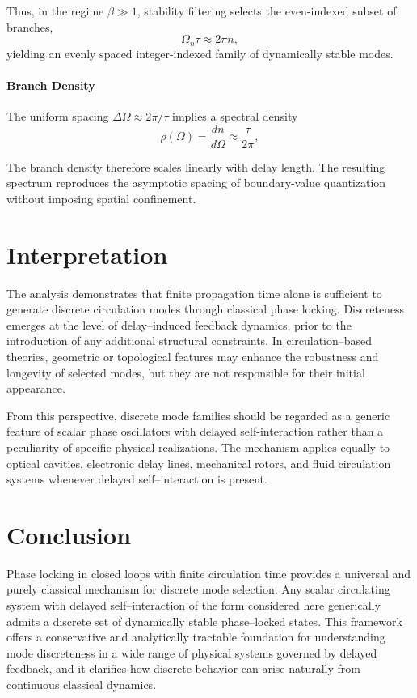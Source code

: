 \documentclass[11pt]{article}
\begin{document}
            Thus, in the regime $\beta\gg1$, stability filtering selects the even-indexed subset of branches,
            \begin{equation}
                \Omega_n\tau\approx2\pi n,
            \end{equation}
            yielding an evenly spaced integer-indexed family of dynamically stable modes.

    \paragraph{Branch Density}

        The uniform spacing $\Delta\Omega\approx2\pi/\tau$ implies a spectral density
        \begin{equation}
            \rho(\Omega)=\frac{dn}{d\Omega}\approx\frac{\tau}{2\pi},
            \end{equation}

        The branch density therefore scales linearly with delay length.
        The resulting spectrum reproduces the asymptotic spacing of boundary-value quantization without imposing spatial confinement.
    \section{Interpretation}
    The analysis demonstrates that finite propagation time alone is sufficient to generate discrete circulation modes through classical phase locking. Discreteness emerges at the level of delay--induced feedback dynamics, prior to the introduction of any additional structural constraints. In circulation--based theories, geometric or topological features may enhance the robustness and longevity of selected modes, but they are not responsible for their initial appearance.

    From this perspective, discrete mode families should be regarded as a generic feature of scalar phase oscillators with delayed self-interaction rather than a peculiarity of specific physical realizations. The mechanism applies equally to optical cavities, electronic delay lines, mechanical rotors, and fluid circulation systems whenever delayed self--interaction is present.

    \section{Conclusion}
    Phase locking in closed loops with finite circulation time provides a universal and purely classical mechanism for discrete mode selection. Any scalar circulating system with delayed self--interaction of the form considered here generically admits a discrete set of dynamically stable phase--locked states. This framework offers a conservative and analytically tractable foundation for understanding mode discreteness in a wide range of physical systems governed by delayed feedback, and it clarifies how discrete behavior can arise naturally from continuous classical dynamics.
\end{document}

